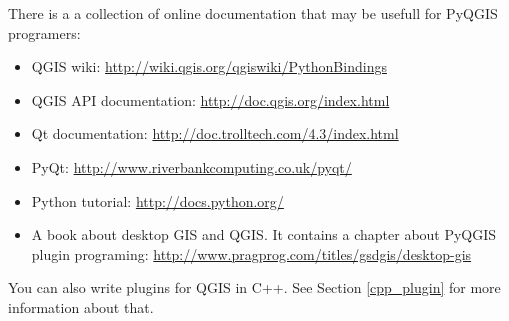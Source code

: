 There is a a collection of online documentation that may be usefull for
PyQGIS programers:
 
\begin{itemize}
\item QGIS wiki: \url{http://wiki.qgis.org/qgiswiki/PythonBindings}
\item QGIS API documentation: \url{http://doc.qgis.org/index.html}
\item Qt documentation: \url{http://doc.trolltech.com/4.3/index.html}
\item PyQt: \url{http://www.riverbankcomputing.co.uk/pyqt/}
\item Python tutorial: \url{http://docs.python.org/}
\item A book about desktop GIS and QGIS. It contains a chapter about PyQGIS
plugin programing: \url{http://www.pragprog.com/titles/gsdgis/desktop-gis} 
\end{itemize}

You can also write plugins for QGIS in C++. See Section \ref{cpp_plugin} for
more information about that.

